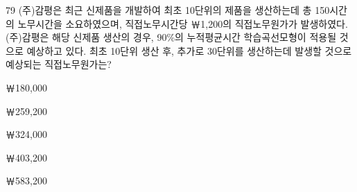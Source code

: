 \begin{question}{79}
(주)감평은 최근 신제품을 개발하여 최초 10단위의 제품을 생산하는데 총 150시간의 노무시간을 소요하였으며, 직접노무시간당 ￦1,200의 직접노무원가가 발생하였다. (주)감평은 해당 신제품 생산의 경우, 90\%의 누적평균시간 학습곡선모형이 적용될 것으로 예상하고 있다. 최초 10단위 생산 후, 추가로 30단위를 생산하는데 발생할 것으로 예상되는 직접노무원가는?
\begin{choices}
  \item ￦180,000
  \item ￦259,200
  \item ￦324,000
  \item ￦403,200
  \item ￦583,200
\end{choices}
\end{question}
